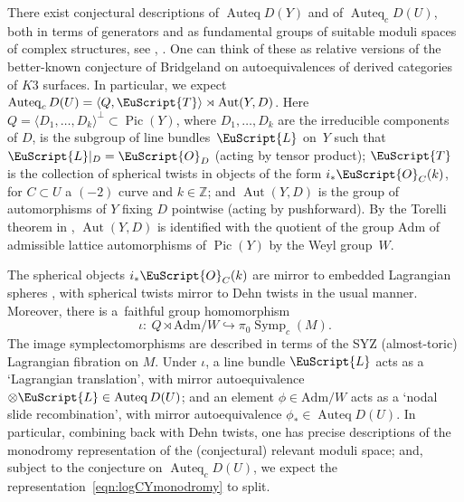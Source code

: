 \documentclass[pdftex]{sigma}
\DeclareMathOperator{\Aut}{Aut}
\DeclareMathOperator{\Auteq}{Auteq}
\newcommand{\Adm}{\mathrm{Adm}}
\def\cL{\EuScript{L}}
\def\cO{\EuScript{O}}
\def\cT{\EuScript{T}}
\DeclareMathOperator{\Symp}{Symp}
\def\bZ{\mathbb{Z}}
\DeclareMathOperator{\Pic}{Pic}
\theoremstyle{definition}
\numberwithin{equation}{section}
\begin{document}
There exist conjectural descriptions of $\Auteq D(Y)$ and of $\Auteq_c D(U)$,
both in terms of generators and as fundamental groups of suitable moduli spaces of complex structures, see \cite[Conjecture~1.2]{Uehara}, \cite[Conjectures~1.5 and~1.7]{Hacking-Keating-2}. One can think of these as relative versions of the better-known conjecture of Bridgeland on autoequivalences of derived categories of $K3$ surfaces. In particular, we expect $\Auteq_c D(U) = \langle Q, \cT \rangle \rtimes \Aut (Y, D)$. Here $Q = \langle D_1, \dots, D_k \rangle^\perp \subset \Pic (Y)$, where $D_1, \dots, D_k$ are the irreducible components of $D$, is the subgroup of line bundles~$\cL$ on~$Y$ such that $\cL|_D = \cO_D$ (acting by tensor product); $\cT$ is the collection of spherical twists in objects of the form $i_\ast \cO_C (k)$, for $C \subset U$ a $(-2)$ curve and $k \in \bZ$; and $\Aut (Y, D )$ is the group of automorphisms of $Y$ fixing $D$ pointwise (acting by pushforward). By the Torelli theorem in \cite{GHK2}, $\Aut (Y, D )$ is identified with the quotient of the group $\Adm$ of admissible lattice automorphisms of $\Pic (Y)$ by the Weyl group~$W$.

The spherical objects $i_\ast \cO_C (k)$ are mirror to embedded Lagrangian spheres \cite[Proposition~5.2]{Hacking-Keating-2}, with spherical twists mirror to Dehn twists in the usual manner. Moreover, there is a~faithful group homomorphism \cite[Theorem~7.1]{Hacking-Keating-2}
\begin{equation} \label{eqn:logCYmonodromy}
\iota\colon \ Q \rtimes \Adm / W \hookrightarrow \pi_0 \Symp_c (M).
\end{equation}
The image symplectomorphisms are described in terms of the SYZ (almost-toric) Lagrangian fibration on $M$.
Under $\iota$, a line bundle $\cL$ acts as a `Lagrangian translation', with mirror autoequivalence $\otimes \cL \in \Auteq D(U)$; and an element $\phi \in \Adm / W$ acts as a `nodal slide recombination', with mirror autoequivalence $\phi_\ast \in \Auteq D(U)$.
In particular, combining back with Dehn twists, one has precise descriptions of the monodromy representation of the (conjectural) relevant moduli space; and, subject to the conjecture on $\Auteq_c D(U)$, we expect the representation~\eqref{eqn:logCYmonodromy} to split.
\end{document}
